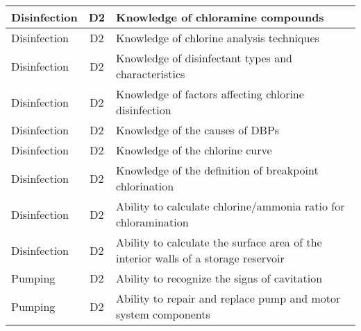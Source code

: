 \documentclass{article}
\begin{document}
\begin{table}[]
\begin{tabular}{|l|c|l|}
Disinfection                           & D2             & Knowledge of   chloramine compounds                                                                                               \\ \hline
Disinfection                           & D2             & Knowledge of chlorine   analysis techniques                                                                                       \\ \hline
Disinfection                           & D2             & Knowledge of   disinfectant types and characteristics                                                                             \\ \hline
Disinfection                           & D2             & Knowledge of factors   affecting chlorine disinfection                                                                            \\ \hline
Disinfection                           & D2             & Knowledge of the   causes of DBPs                                                                                                 \\ \hline
Disinfection                           & D2             & Knowledge of the   chlorine curve                                                                                                 \\ \hline
Disinfection                           & D2             & Knowledge of the   definition of breakpoint chlorination                                                                          \\ \hline
Disinfection                           & D2             & Ability to calculate   chlorine/ammonia ratio for chloramination                                                                  \\ \hline
Disinfection                           & D2             & Ability to calculate   the surface area of the interior walls of a storage reservoir                                              \\ \hline
Pumping                                & D2             & Ability to recognize   the signs of cavitation                                                                                    \\ \hline
Pumping                                & D2             & Ability to repair and   replace pump and motor system components                                                                  \\ \hline

\end{tabular}
\end{table}
\end{document}
